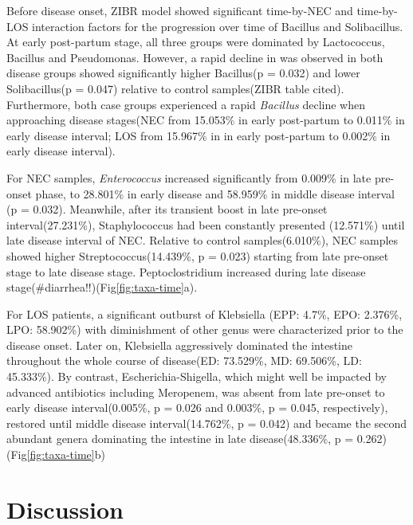 \documentclass[fleqn,10pt]{wlpeerj} %
\begin{document}

  \noindent
  Before disease onset, ZIBR model showed significant time-by-NEC and time-by-LOS interaction factors for the progression over time of Bacillus and Solibacillus. At early post-partum stage, all three groups were dominated by Lactococcus, Bacillus and Pseudomonas. However, a rapid decline in was observed in both disease groups showed significantly higher Bacillus(p = 0.032) and lower Solibacillus(p = 0.047) relative to control samples(ZIBR table cited). Furthermore, both case groups experienced a rapid \textit{Bacillus} decline when approaching disease stages(NEC from 15.053\% in early post-partum to 0.011\% in early disease interval; LOS from 15.967\% in in early post-partum to 0.002\% in early disease interval). %

  \noindent
  For NEC samples, \textit{Enterococcus} increased significantly from 0.009\% in late pre-onset phase, to 28.801\% in early disease and 58.959\% in middle disease interval (p = 0.032). Meanwhile, after its transient boost in late pre-onset interval(27.231\%), Staphylococcus had been constantly presented (12.571\%) until late disease interval of NEC. Relative to control samples(6.010\%), NEC samples showed higher Streptococcus(14.439\%, p = 0.023) starting from late pre-onset stage to late disease stage. Peptoclostridium increased during late disease stage(\#diarrhea!!)(Fig\ref{fig:taxa-time}a).

  \noindent
  For LOS patients, a significant outburst of Klebsiella (EPP: 4.7\%, EPO: 2.376\%, LPO: 58.902\%) with diminishment of other genus were characterized prior to the disease onset. Later on, Klebsiella aggressively dominated the intestine throughout the whole course of disease(ED: 73.529\%, MD: 69.506\%, LD: 45.333\%). By contrast, Escherichia-Shigella, which might well be impacted by advanced antibiotics including Meropenem, was absent from late pre-onset to early disease interval(0.005\%, p = 0.026 and 0.003\%, p = 0.045, respectively), restored until middle disease interval(14.762\%, p = 0.042) and became the second abundant genera dominating the intestine in late disease(48.336\%, p = 0.262)(Fig\ref{fig:taxa-time}b)

\section*{Discussion}
\end{document}
